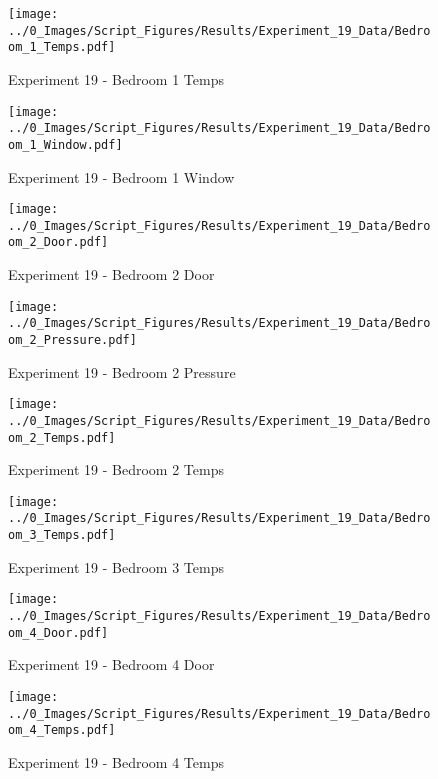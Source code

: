 	\begin{figure}[H]
		\centering
		\texttt{[image: ../0\_Images/Script\_Figures/Results/Experiment\_19\_Data/Bedroom\_1\_Temps.pdf]}
		\caption[]{Experiment 19 - Bedroom 1 Temps}
	\end{figure}
 
	\clearpage

	\begin{figure}[H]
		\centering
		\texttt{[image: ../0\_Images/Script\_Figures/Results/Experiment\_19\_Data/Bedroom\_1\_Window.pdf]}
		\caption[]{Experiment 19 - Bedroom 1 Window}
	\end{figure}
 

	\begin{figure}[H]
		\centering
		\texttt{[image: ../0\_Images/Script\_Figures/Results/Experiment\_19\_Data/Bedroom\_2\_Door.pdf]}
		\caption[]{Experiment 19 - Bedroom 2 Door}
	\end{figure}
 
	\clearpage

	\begin{figure}[H]
		\centering
		\texttt{[image: ../0\_Images/Script\_Figures/Results/Experiment\_19\_Data/Bedroom\_2\_Pressure.pdf]}
		\caption[]{Experiment 19 - Bedroom 2 Pressure}
	\end{figure}
 

	\begin{figure}[H]
		\centering
		\texttt{[image: ../0\_Images/Script\_Figures/Results/Experiment\_19\_Data/Bedroom\_2\_Temps.pdf]}
		\caption[]{Experiment 19 - Bedroom 2 Temps}
	\end{figure}
 
	\clearpage

	\begin{figure}[H]
		\centering
		\texttt{[image: ../0\_Images/Script\_Figures/Results/Experiment\_19\_Data/Bedroom\_3\_Temps.pdf]}
		\caption[]{Experiment 19 - Bedroom 3 Temps}
	\end{figure}
 

	\begin{figure}[H]
		\centering
		\texttt{[image: ../0\_Images/Script\_Figures/Results/Experiment\_19\_Data/Bedroom\_4\_Door.pdf]}
		\caption[]{Experiment 19 - Bedroom 4 Door}
	\end{figure}
 
	\clearpage

	\begin{figure}[H]
		\centering
		\texttt{[image: ../0\_Images/Script\_Figures/Results/Experiment\_19\_Data/Bedroom\_4\_Temps.pdf]}
		\caption[]{Experiment 19 - Bedroom 4 Temps}
	\end{figure}
 

